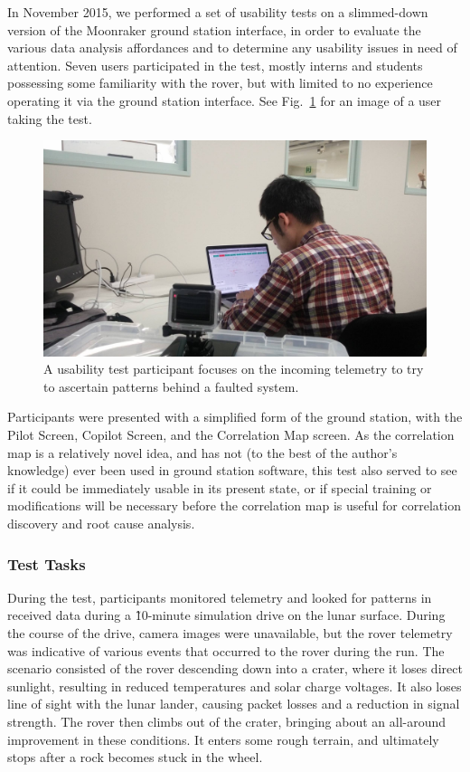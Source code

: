 In November 2015, we performed a set of usability tests on a slimmed-down version of the Moonraker ground station interface, in order to evaluate the various data analysis affordances and to determine any usability issues in need of attention. Seven users participated in the test, mostly interns and students possessing some familiarity with the rover, but with limited to no experience operating it via the ground station interface. See Fig.~\ref{fig:ui_test_takako} for an image of a user taking the test.

\begin{figure}[h]
\centering
    \includegraphics[width=\columnwidth]{images/ui_test_takuto.jpg}
    \caption{A usability test participant focuses on the incoming telemetry to try to ascertain patterns behind a faulted system.}
    \label{fig:ui_test_takako}
\end{figure}

Participants were presented with a simplified form of the ground station, with the Pilot Screen, Copilot Screen, and the Correlation Map screen. As the correlation map is a relatively novel idea, and has not (to the best of the author's knowledge) ever been used in ground station software, this test also served to see if it could be immediately usable in its present state, or if special training or modifications will be necessary before the correlation map is useful for correlation discovery and root cause analysis.

\subsubsection{Test Tasks}

During the test, participants monitored telemetry and looked for patterns in received data during a \~10-minute simulation drive on the lunar surface. During the course of the drive, camera images were unavailable, but the rover telemetry was indicative of various events that occurred to the rover during the run. The scenario consisted of the rover descending down into a crater, where it loses direct sunlight, resulting in reduced temperatures and solar charge voltages. It also loses line of sight with the lunar lander, causing packet losses and a reduction in signal strength. The rover then climbs out of the crater, bringing about an all-around improvement in these conditions. It enters some rough terrain, and ultimately stops after a rock becomes stuck in the wheel.

